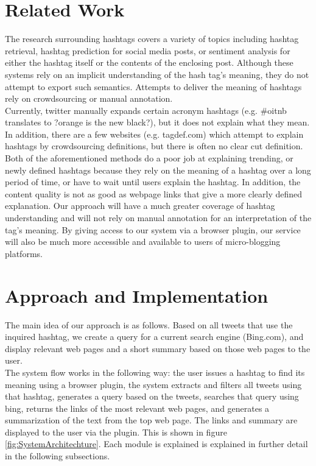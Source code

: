 \documentclass{sig-alternate}
\begin{document}
\section{Related Work}
The research surrounding hashtags covers a variety of topics including hashtag retrieval\cite{efron:retrieval}, hashtag prediction\cite{khabiri:predict}\cite{tagspace} for social media posts, or sentiment analysis for either the hashtag itself or the contents of the enclosing post.  Although these systems rely on an implicit understanding of the hash tag's meaning, they do not attempt to export such semantics.  Attempts to deliver the meaning of hashtags rely on crowdsourcing or manual annotation.\\
Currently, twitter manually expands certain acronym hashtags (e.g. \#oitnb translates to ?orange is the new black?), but it does not explain what they mean. In addition, there are a few websites (e.g. tagdef.com) which attempt to explain hashtags by crowdsourcing definitions, but there is often no clear cut definition. Both of the aforementioned methods do a poor job at explaining trending, or newly defined hashtags because they rely on the meaning of a hashtag over a long period of time, or have to wait until users explain the hashtag. In addition, the content quality is not as good as webpage links that give a more clearly defined explanation.
Our approach will have a much greater coverage of hashtag understanding and will not rely on manual annotation for an interpretation of the tag's meaning.  By giving access to our system via a browser plugin, our service will also be much more accessible and available to users of micro-blogging platforms.\\

\section{Approach and Implementation}

The main idea of our approach is as follows. Based on all tweets that use the inquired hashtag, we create a query for a current search engine (Bing.com), and display relevant web pages and a short summary based on those web pages to the user. \\
The system flow works in the following way: the user issues a hashtag to find its meaning using a browser plugin, the system extracts and filters all tweets using that hashtag, generates a query based on the tweets, searches that query using bing, returns the links of the most relevant web pages, and generates a summarization of the text from the top web page. The links and summary are displayed to the user via the plugin. This is shown in figure \ref{fig:SystemArchitechture}. Each module is explained is explained in further detail in the following subsections.
\end{document}
